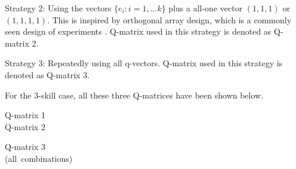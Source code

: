 \documentclass{edm_template}
\begin{document}
Strategy 2: Using the vectors $\{e_{i}:i=1,...k\}$ plus a all-one vector $(1,1,1)$ or $(1,1,1,1)$. This is inspired by orthogonal array design, which is a commonly seen design of experiments \cite{montgomery2017design}. Q-matrix used in this strategy is denoted as Q-matrix 2.

Strategy 3: Repeatedly using all q-vectors. Q-matrix used in this strategy is denoted as Q-matrix 3.

For the 3-skill case, all these three Q-matrices have been shown below. 

\parbox{.5\columnwidth}{
\centering
Q-matrix 1\\
\vspace*{-1ex}
\vspace*{2ex}
{Q-matrix 2}\\
\vspace*{-1ex}
}
\parbox{.5\columnwidth}{
\centering
{Q-matrix 3}\\{(all~combinations)} \\
}
\end{document}
